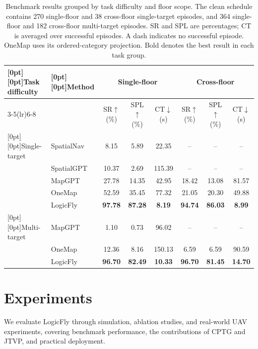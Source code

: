 \documentclass[letterpaper,10pt,journal]{IEEEtran}
\begin{document}
\begin{table}[t]
\caption{Benchmark results grouped by task difficulty and floor scope. The clean schedule contains 270 single-floor and 38 cross-floor single-target episodes, and 364 single-floor and 182 cross-floor multi-target episodes. SR and SPL are percentages; CT is averaged over successful episodes. A dash indicates no successful episode. OneMap uses its ordered-category projection. Bold denotes the best result in each task group.}
\label{tab:main}\centering\small\renewcommand{\arraystretch}{1.15}
\begin{tabular*}{0.94\textwidth}{@{\extracolsep{\fill}}llcccccc@{}}\toprule
\raisebox{-8pt}[0pt][0pt]{Task difficulty}&\raisebox{-8pt}[0pt][0pt]{Method}&\multicolumn{3}{c}{Single-floor}&\multicolumn{3}{c}{Cross-floor}\\
\cmidrule(lr){3-5}\cmidrule(lr){6-8}
&&SR$\uparrow$ (\%)&SPL$\uparrow$ (\%)&CT$\downarrow$ (s)&SR$\uparrow$ (\%)&SPL$\uparrow$ (\%)&CT$\downarrow$ (s)\\\midrule
\raisebox{-22.9pt}[0pt][0pt]{Single-target}&SpatialNav&8.15&5.89&22.35&\multicolumn{1}{c}{--}&\multicolumn{1}{c}{--}&\multicolumn{1}{c}{--}\\
&SpatialGPT&10.37&2.69&115.39&\multicolumn{1}{c}{--}&\multicolumn{1}{c}{--}&\multicolumn{1}{c}{--}\\
&MapGPT&27.78&14.35&42.95&18.42&13.08&81.57\\
&OneMap&52.59&35.45&77.32&21.05&20.30&49.88\\
&LogicFly&\textbf{97.78}&\textbf{87.28}&\textbf{8.19}&\textbf{94.74}&\textbf{86.03}&\textbf{8.99}\\\midrule
\raisebox{-11.45pt}[0pt][0pt]{Multi-target}&MapGPT&1.10&0.73&96.02&\multicolumn{1}{c}{--}&\multicolumn{1}{c}{--}&\multicolumn{1}{c}{--}\\
&OneMap&12.36&8.16&150.13&6.59&6.59&90.59\\
&LogicFly&\textbf{96.70}&\textbf{82.49}&\textbf{10.33}&\textbf{96.70}&\textbf{81.45}&\textbf{14.70}\\\bottomrule
\end{tabular*}
\end{table}

\section{Experiments}
We evaluate LogicFly through simulation, ablation studies, and real-world UAV experiments, covering benchmark performance, the contributions of CPTG and JTVP, and practical deployment.
\end{document}
